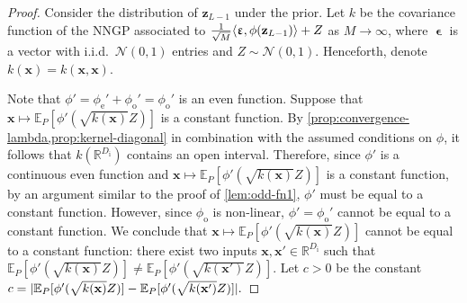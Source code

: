 \documentclass[twoside]{article}
\renewcommand{\ss}[1]{_{\text{#1}}}
\newcommand{\vx}{\mathbf{x}}
\newcommand{\vz}{\mathbf{z}}
\newcommand{\vep}{\bm{\upvarepsilon}}
\newcommand{\E}{\mathbb{E}}
\newcommand{\R}{\mathbb{R}}
\newcommand{\Normal}{\mathcal{N}}
\renewcommand{\ss}[1]{_{\text{#1}}}        %
\DeclarePairedDelimiter\lra{\langle}{\rangle}    %
\DeclarePairedDelimiter\abs{|}{|}                %
\theoremstyle{theoremstyle}
\begin{document}
\begin{proof}
    Consider the distribution of $\vz_{L-1}$ under the prior.
    Let $k$ be the covariance function of the NNGP associated to $\tfrac1{\sqrt{M}}\lra{\vep, \phi(\vz_{L-1})} + Z$ as $M \to \infty$, where $\vep$ is a vector with i.i.d.\ $\Normal(0, 1)$ entries and $Z \sim \Normal(0, 1)$.
    Henceforth, denote $k(\vx) = k(\vx, \vx)$.

    Note that $\phi' = \phi\ss{e}' + \phi\ss{o}' = \phi\ss{o}'$ is an even function.
    Suppose that $\vx \mapsto \E_{P}[\phi'(\sqrt{k(\vx)} Z)]$ is a constant function.
    By \cref{prop:convergence-lambda,prop:kernel-diagonal} in combination with the assumed conditions on $\phi$, it follows that $k(\R^{D\ss{i}})$ contains an open interval.
    Therefore, since $\phi'$ is a continuous even function and $\vx \mapsto \E_{P}[\phi'(\sqrt{k(\vx)} Z)]$ is a constant function, by an argument similar to the proof of \cref{lem:odd-fn1}, $\phi'$ must be equal to a constant function.
    However, since $\phi\ss{o}$ is non-linear, $\phi' = \phi\ss{o}'$ cannot be equal to a constant function.
    We conclude that $\vx \mapsto \E_{P}[\phi'(\sqrt{k(\vx)} Z)]$ cannot be equal to a constant function: there exist two inputs $\vx, \vx' \in \R^{D\ss{i}}$ such that $\E_{P}[\phi'(\sqrt{k(\vx)} Z)] \neq \E_{P}[\phi'(\sqrt{k(\vx')} Z)]$.
    Let $c > 0$ be the constant $c = \abs{\E_{P}[\phi'(\sqrt{k(\vx)} Z)] - \E_{P}[\phi'(\sqrt{k(\vx')} Z)]}.$


\end{proof}
\end{document}
